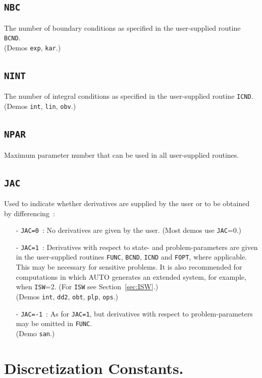\documentclass[12pt]{report}
\begin{document}
\subsection{\texttt{NBC}}  \label{sec:NBC}
 The number of boundary conditions as specified in the user-supplied
 routine {\tt BCND}. \\
(Demos {\tt exp}, {\tt kar}.)

\subsection{\texttt{NINT}}  \label{sec:NINT}
 The number of integral conditions as specified in the user-supplied
 routine {\tt ICND}. \\ 
(Demos {\tt int}, {\tt lin}, {\tt obv}.)

\subsection{\texttt{NPAR}} \label{sec:NPAR}
 Maximum parameter number that can be used in all user-supplied
 routines.

\subsection{\texttt{JAC}}  \label{sec:JAC}
 Used to indicate whether derivatives are supplied by the user
 or to be obtained by differencing~:
\begin{itemize}
\item[-] {\tt JAC=0}~: 
  No derivatives are given by the user. (Most demos use {\tt JAC}=0.)
\item[-] {\tt JAC=1}~:  
  Derivatives with respect to state- and problem-parameters are given 
  in the user-supplied routines 
  {\tt FUNC}, {\tt BCND}, {\tt ICND} and {\tt FOPT}, where 
  applicable.  This may be necessary for sensitive problems. 
  It is also recommended for computations in which {\cal AUTO} generates 
  an extended system, for example, when {\tt ISW}=2.
  (For {\tt ISW} see Section~\ref{sec:ISW}.) \\
(Demos {\tt int}, {\tt dd2}, {\tt obt}, {\tt plp}, {\tt ops}.)
\item[-] {\tt JAC=-1}~:
  As for {\tt JAC=1}, but derivatives with respect to
  problem-parameters may be omitted in {\tt FUNC}. \\
(Demo {\tt san}.)
\end{itemize}
\section{ Discretization Constants.} \label{sec:Discretization_constants}
\end{document}
